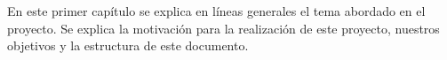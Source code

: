 En este primer capítulo se explica en líneas generales el tema abordado en el proyecto. Se explica la motivación para la realización de este proyecto, nuestros objetivos y la estructura de este documento.

